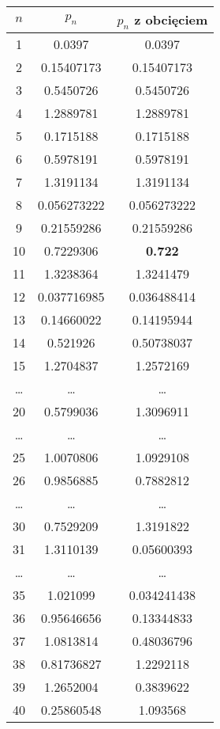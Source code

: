\documentclass[a4paper]{article}
\begin{document}
\paragraph{}
\begin{center}
\small
 \begin{tabular}{ |c | c | c|  }
 \hline
 $n$ & $p_{n}$ & $p_{n}$ z obcięciem \\
 \hline
1 & 0.0397 & 0.0397 \\
2 & 0.15407173 & 0.15407173 \\
3 & 0.5450726 & 0.5450726 \\
4 & 1.2889781 & 1.2889781 \\
5 & 0.1715188 & 0.1715188 \\
6 & 0.5978191 & 0.5978191 \\
7 & 1.3191134 & 1.3191134 \\
8 & 0.056273222 & 0.056273222 \\
9 & 0.21559286 & 0.21559286 \\
10 & 0.7229306 & \textbf{0.722} \\
11 & 1.3238364 & 1.3241479 \\
12 & 0.037716985 & 0.036488414 \\
13 & 0.14660022 & 0.14195944 \\
14 & 0.521926 & 0.50738037 \\
15 & 1.2704837 & 1.2572169 \\
\ldots & \ldots & \ldots \\
20 & 0.5799036 & 1.3096911 \\
\ldots & \ldots & \ldots \\
25 & 1.0070806 & 1.0929108 \\
26 & 0.9856885 & 0.7882812 \\
\ldots & \ldots & \ldots \\
30 & 0.7529209 & 1.3191822 \\
31 & 1.3110139 & 0.05600393 \\
\ldots & \ldots & \ldots \\
35 & 1.021099 & 0.034241438 \\
36 & 0.95646656 & 0.13344833 \\
37 & 1.0813814 & 0.48036796 \\
38 & 0.81736827 & 1.2292118 \\
39 & 1.2652004 & 0.3839622 \\
40 & 0.25860548 & 1.093568 \\
 \hline
\end{tabular}
\end{center}
\end{document}
